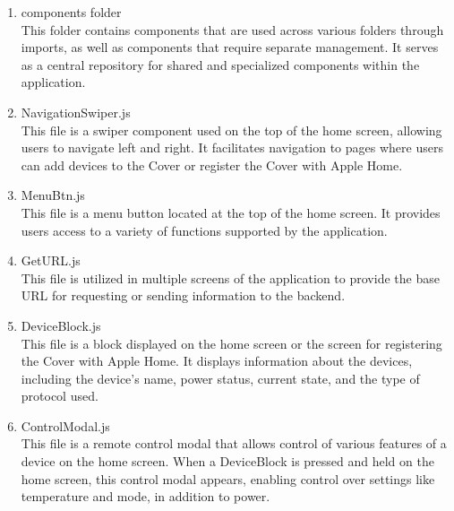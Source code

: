 \documentclass[conference]{IEEEtran}
\begin{document}
\begin{enumerate}[label=\arabic*.]
\begin{enumerate}[label=\alph*.]
\item components folder\\
This folder contains components that are used across various folders through imports, as well as components that require separate management. It serves as a central repository for shared and specialized components within the application.\\
\item NavigationSwiper.js\\
This file is a swiper component used on the top of the home screen, allowing users to navigate left and right. It facilitates navigation to pages where users can add devices to the Cover or register the Cover with Apple Home.\\
\item MenuBtn.js\\
This file is a menu button located at the top of the home screen. It provides users access to a variety of functions supported by the application.\\
\item GetURL.js\\
This file is utilized in multiple screens of the application to provide the base URL for requesting or sending information to the backend.\\
\item DeviceBlock.js\\
This file is a block displayed on the home screen or the screen for registering the Cover with Apple Home. It displays information about the devices, including the device's name, power status, current state, and the type of protocol used.\\
\item ControlModal.js\\
This file is a remote control modal that allows control of various features of a device on the home screen. When a DeviceBlock is pressed and held on the home screen, this control modal appears, enabling control over settings like temperature and mode, in addition to power.\\
\end{enumerate}
\end{enumerate}
\end{document}
